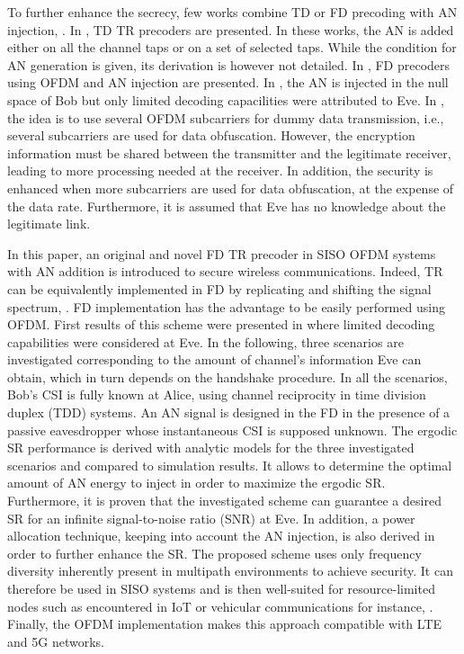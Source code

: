 \documentclass[journal,comsoc]{IEEEtran}
\begin{document}
To further enhance the secrecy, few works combine TD or FD precoding with AN injection, \cite{9049811,xu2018security,li2018artificial,li2017artificial,7475864,7041552}. In \cite{xu2018security,li2018artificial,li2017artificial}, TD TR precoders are presented. In these works, the AN is added either on all the channel taps or on a set of selected taps. While the condition for AN generation is given, its derivation is however not detailed. In \cite{9049811,7475864,7041552}, FD precoders using OFDM and AN injection are presented. In \cite{9049811}, the AN is injected in the null space of Bob but only limited decoding capacilities were attributed to Eve. In \cite{7475864,7041552}, the idea is to use several OFDM subcarriers for dummy data transmission, i.e., several subcarriers are used for data obfuscation. However, the encryption information must be shared between the transmitter and the legitimate receiver, leading to more processing needed at the receiver. In addition, the security is enhanced when more subcarriers are used for data obfuscation, at the expense of the data rate. Furthermore, it is assumed that Eve has no knowledge about the legitimate link.

In this paper, an original and novel FD TR precoder in SISO OFDM systems with AN addition is introduced to secure wireless communications. Indeed, TR can be equivalently implemented in FD by replicating and shifting the signal spectrum, \cite{8883213}. FD implementation has the advantage to be easily performed using OFDM. First results of this scheme were presented in \cite{9049811} where limited decoding capabilities were considered at Eve. In the following, three scenarios are investigated corresponding to the amount of channel's information Eve can obtain, which in turn depends on the handshake procedure.  In all the scenarios, Bob's CSI is fully known at Alice, using channel reciprocity in time division duplex (TDD) systems. An AN signal is designed in the FD in the presence of a passive eavesdropper whose instantaneous CSI is supposed unknown. The ergodic SR performance is derived with analytic models for the three investigated scenarios and compared to simulation results. It allows to determine the optimal amount of AN energy to inject in order to maximize the ergodic SR. Furthermore, it is proven that the investigated scheme can guarantee a desired SR for an infinite signal-to-noise ratio (SNR) at Eve. In addition, a power allocation technique, keeping into account the AN injection, is also derived in order to further enhance the SR. The proposed scheme uses only frequency diversity inherently present in multipath environments to achieve security. It can therefore be used in SISO systems and is then well-suited for resource-limited nodes such as encountered in IoT or vehicular communications for instance, \cite{9049811}. Finally, the OFDM implementation makes this approach compatible with LTE and 5G networks.
\end{document}
